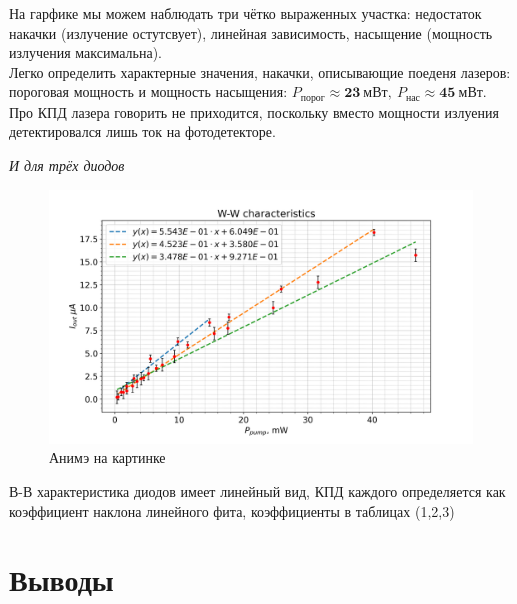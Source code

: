\documentclass[a4paper]{article}
\begin{document}
        \par На гарфике мы можем наблюдать три чётко выраженных участка: недостаток накачки (излучение остутсвует), линейная зависимость, насыщение (мощность излучения максимальна).\\
        Легко определить характерные значения, накачки, описывающие поеденя лазеров: пороговая мощность и мощность насыщения: {$P_{\mbox{порог}} \approx \textbf{23} \: \mbox{мВт}, \: P_{\mbox{нас}} \approx \textbf{45} \:  \mbox{мВт}$}. Про КПД лазера говорить не приходится, поскольку вместо мощности излуения детектировался лишь ток на фотодетекторе.
        
        \vspace{1cm}
        
        \par \textit{И для трёх диодов}
        
        \begin{figure}[H]
            \begin{center}
                \includegraphics[scale=0.5]{W-W-led.png}
                \caption{Анимэ на картинке}
                \label{W-W-led}
            \end{center}
        \end{figure}
        
        \par В-В характеристика диодов имеет линейный вид, КПД каждого определяется как коэффициент наклона линейного фита, коэффициенты в таблицах (1,2,3)
        
        
        
        
        
        \newpage
    
\section{Выводы}
\end{document}
